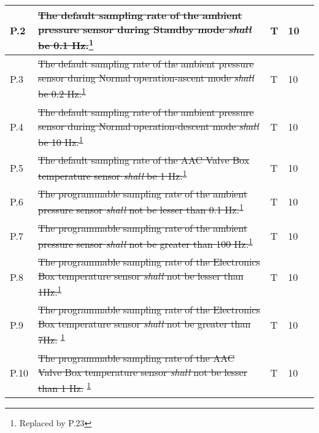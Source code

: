 \begin{longtable}[]{|m{}| m{} |m{} |m{}|m{}|}
P.2  & \st{The default sampling rate of the ambient pressure sensor during Standby mode \textit{shall} be 0.1 Hz.}\footnote{Replaced by P.23\label{replaceSoftVeri}}                                                                       &      T        & 10            &        \\ \hline
P.3  & \st{The default sampling rate of the ambient pressure sensor during Normal operation-ascent mode \textit{shall} be 0.2 Hz.}\textsuperscript{\ref{replaceSoftVeri}}                                                           &      T        & 10            &        \\ \hline
P.4  & \st{The default sampling rate of the ambient pressure sensor during Normal operation-descent mode \textit{shall} be 10 Hz.}\textsuperscript{\ref{replaceSoftVeri}}                                                           &       T       & 10            &        \\ \hline
P.5  & \st{The default sampling rate of the AAC Valve Box temperature sensor \textit{shall} be 1 Hz.}\textsuperscript{\ref{replaceSoftVeri}}                                                                                        &      T        & 10            &        \\ \hline
P.6  &\st{ The programmable sampling rate of the ambient pressure sensor \textit{shall} not be lesser than 0.1 Hz.}\textsuperscript{\ref{replaceSoftVeri}}                                                                          &      T        & 10            &        \\ \hline
P.7  & \st{The programmable sampling rate of the ambient pressure sensor \textit{shall} not be greater than 100 Hz.}\textsuperscript{\ref{replaceSoftVeri}}                                                                         &       T       & 10            &        \\ \hline
P.8  & \st{The programmable sampling rate of the Electronics Box temperature sensor \textit{shall} not be lesser than 1Hz.}\textsuperscript{\ref{replaceSoftVeri}}                                                                          &       T       & 10            &        \\ \hline
P.9  & \st{The programmable sampling rate of the Electronics Box temperature sensor \textit{shall} not be greater than 7Hz. }\textsuperscript{\ref{replaceSoftVeri}}                                                                        &        T      & 10            &        \\ \hline
P.10 & \st{The programmable sampling rate of the AAC Valve Box temperature sensor \textit{shall} not be lesser than 1 Hz. }\textsuperscript{\ref{replaceSoftVeri}}                                                                  &        T      & 10            &        \\ \hline

\end{longtable}
